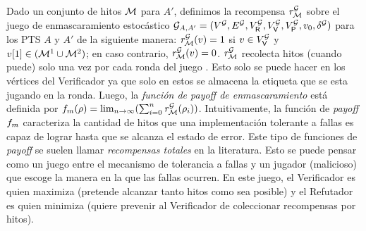 Dado un conjunto de hitos $\milestones$ para $A'$, definimos la recompensa
$\mreward^\StochG$ sobre el juego de enmascaramiento estocástico
$\StochG_{A,A'} = (V^\StochG, E^\StochG, V^\StochG_\Refuter, V^\StochG_\Verifier, V^\StochG_\Probabilistic, \InitVertex, \delta^\StochG)$ para los PTS $A$ y $A'$ de la siguiente manera:
%
$\mreward^\StochG(v) = 1$ si $v\in V^\StochG_\Verifier$ y
$\pr{1}{v}\in(\milestones^1\cup\milestones^2)$; en caso contrario,
$\mreward^\StochG(v) = 0$.
%
$\mreward^\StochG$ recolecta hitos (cuando puede) solo una vez por cada ronda del juego
. Esto solo se puede hacer en los vértices del Verificador ya que solo en estos se almacena la etiqueta que se esta jugando en la ronda.
%
Luego, la \emph{función de payoff de enmascaramiento} está definida por
%
$\FMask(\rho) = \lim_{n \rightarrow \infty} (\sum^{n}_{i=0} \mreward^\StochG(\rho_i))$.
%
Intuitivamente, la función de \emph{payoff} $\FMask$ caracteriza la cantidad de hitos que una implementación tolerante a fallas es capaz de lograr hasta que se alcanza el estado de error. Este tipo de funciones de \emph{payoff} se suelen llamar \emph{recompensas totales} en la literatura.
Esto se puede pensar como un juego entre el mecanismo de tolerancia a fallas y un jugador (malicioso) que escoge la manera en la que las fallas ocurren. En este juego, el Verificador es quien maximiza (pretende alcanzar tanto hitos como sea posible) y el Refutador es quien minimiza (quiere prevenir al Verificador de coleccionar recompensas por hitos).  

    

